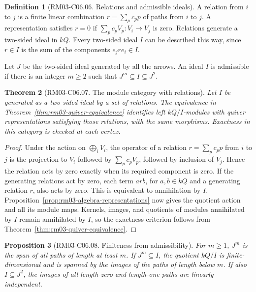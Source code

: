 \documentclass[11pt,oneside,openany]{book}
\newtheorem{theorem}{Theorem}[chapter]
\newtheorem{proposition}[theorem]{Proposition}
\theoremstyle{definition}
\newtheorem{definition}[theorem]{Definition}
\theoremstyle{remark}
\begin{document}
\begin{definition}[RM03-C06.06. Relations and admissible ideals]
\label{def:rm03-quiver-relations}
A relation from \(i\) to \(j\) is a finite linear combination
\(r=\sum_p c_p p\) of paths from \(i\) to \(j\). A representation
satisfies \(r=0\) if \(\sum_p c_p V_p\colon V_i\to V_j\) is zero.
Relations generate a two-sided ideal in \(kQ\). Every two-sided
ideal \(I\) can be described this way, since \(r\in I\) is the sum
of the components \(e_j r e_i\in I\).

Let \(J\) be the two-sided ideal generated by all the arrows.
An ideal \(I\) is admissible if there is an integer \(m\geq 2\)
such that \(J^m\subseteq I\subseteq J^2\).
\end{definition}

\begin{theorem}[RM03-C06.07. The module category with relations]
\label{thm:rm03-bound-quiver-equivalence}
Let \(I\) be generated as a two-sided ideal by a set of relations.
The equivalence in Theorem~\ref{thm:rm03-quiver-equivalence}
identifies left \(kQ/I\)-modules with quiver representations
satisfying those relations, with the same morphisms. Exactness in
this category is checked at each vertex.
\end{theorem}

\begin{proof}
Under the action on \(\bigoplus_i V_i\), the operator of a
relation \(r=\sum_p c_p p\) from \(i\) to \(j\) is the projection
to \(V_i\) followed by \(\sum_p c_p V_p\), followed by inclusion
of \(V_j\). Hence the relation acts by zero exactly when its
required component is zero. If the generating relations act by
zero, each term \(arb\), for \(a,b\in kQ\) and a generating
relation \(r\), also acts by zero. This is equivalent to
annihilation by \(I\). Proposition~\ref{prop:rm03-algebra-representations}
now gives the quotient action and all its module maps. Kernels,
images, and quotients of modules annihilated by \(I\) remain
annihilated by \(I\), so the exactness criterion follows from
Theorem~\ref{thm:rm03-quiver-equivalence}.
\end{proof}

\begin{proposition}[RM03-C06.08. Finiteness from admissibility]
\label{prop:rm03-admissible-finiteness}
For \(m\geq 1\), \(J^m\) is the span of all paths of length at
least \(m\). If \(J^m\subseteq I\), the quotient \(kQ/I\) is
finite-dimensional and is spanned by the images of the paths of
length below \(m\). If also \(I\subseteq J^2\), the images of all
length-zero and length-one paths are linearly independent.
\end{proposition}
\end{document}
